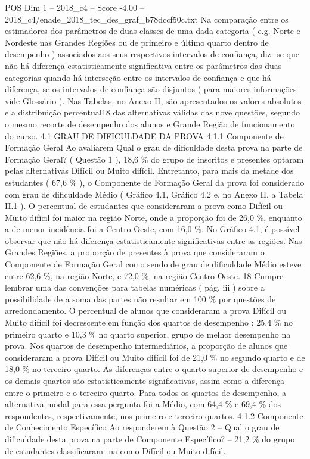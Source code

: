 \begin{textsample}{POS Dim 1 – 2018\_c4 – Score -4.00 – 2018\_c4/enade\_2018\_tec\_des\_graf\_b78dccf50c.txt}
Na comparação entre os estimadores dos parâmetros de duas classes de uma dada categoria ( e.g.
Norte e Nordeste nas Grandes Regiões ou de primeiro e último quarto dentro de desempenho ) associados aos seus respectivos intervalos de confiança, diz -se que não há diferença estatisticamente significativa entre os parâmetros das duas categorias quando há interseção entre os intervalos de confiança e que há diferença, se os intervalos de confiança são disjuntos ( para maiores informações vide Glossário ).
Nas Tabelas, no Anexo II, são apresentados os valores absolutos e a distribuição percentual18 das alternativas válidas das nove questões, segundo o mesmo recorte de desempenho dos alunos e Grande Região de funcionamento do curso. 4.1 GRAU DE DIFICULDADE DA PROVA 4.1.1 Componente de Formação Geral Ao avaliarem Qual o grau de dificuldade desta prova na parte de Formação Geral? ( Questão 1 ), 18,6 \% do grupo de inscritos e presentes optaram pelas alternativas Difícil ou Muito difícil.
Entretanto, para mais da metade dos estudantes ( 67,6 \% ), o Componente de Formação Geral da prova foi considerado com grau de dificuldade Médio ( Gráfico 4.1, Gráfico 4.2 e, no Anexo II, a Tabela II.1 ).
O percentual de estudantes que consideraram a prova como Difícil ou Muito difícil foi maior na região Norte, onde a proporção foi de 26,0 \%, enquanto a de menor incidência foi a Centro-Oeste, com 16,0 \%.
No Gráfico 4.1, é possível observar que não há diferença estatisticamente significativas entre as regiões.
Nas Grandes Regiões, a proporção de presentes à prova que consideraram o Componente de Formação Geral como sendo de grau de dificuldade Médio esteve entre 62,6 \%, na região Norte, e 72,0 \%, na região Centro-Oeste. 18 Cumpre lembrar uma das convenções para tabelas numéricas ( pág. iii ) sobre a possibilidade de a soma das partes não resultar em 100 \% por questões de arredondamento.
O percentual de alunos que consideraram a prova Difícil ou Muito difícil foi decrescente em função dos quartos de desempenho : 25,4 \% no primeiro quarto e 10,3 \% no quarto superior, grupo de melhor desempenho na prova.
Nos quartos de desempenho intermediários, a proporção de alunos que consideraram a prova Difícil ou Muito difícil foi de 21,0 \% no segundo quarto e de 18,0 \% no terceiro quarto.
As diferenças entre o quarto superior de desempenho e os demais quartos são estatisticamente significativas, assim como a diferença entre o primeiro e o terceiro quarto.
Para todos os quartos de desempenho, a alternativa modal para essa pergunta foi a Médio, com 64,4 \% e 69,4 \% dos respondentes, respectivamente, nos primeiro e terceiro quartos. 4.1.2 Componente de Conhecimento Específico Ao responderem à Questão 2 – Qual o grau de dificuldade desta prova na parte de Componente Específico? – 21,2 \% do grupo de estudantes classificaram -na como Difícil ou Muito difícil.

\end{textsample}
